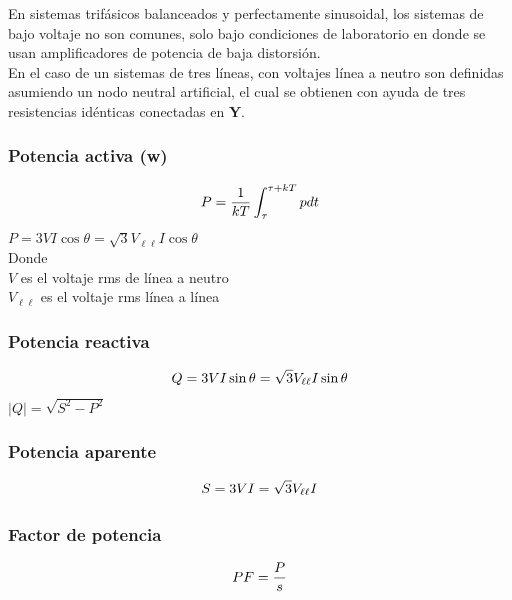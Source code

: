 En sistemas trifásicos balanceados y perfectamente sinusoidal, los sistemas de bajo voltaje no son comunes, solo bajo condiciones de laboratorio en donde se usan amplificadores de potencia de baja distorsión.\cite{A30}\\

En el caso de un sistemas de tres líneas, con voltajes línea a neutro son definidas asumiendo un nodo neutral artificial, el cual se obtienen con ayuda de tres resistencias idénticas conectadas en \textbf{Y}.

\subsubsection{Potencia activa (w)} 
\begin{equation}\label{Eq37}
P=\frac{1}{kT}\int_{\tau}^{\tau +kT}pdt\\
\end{equation}
$P=3VI\cos\theta=\sqrt{3}V_{\ell \ell}I\cos\theta$\\
Donde\\
$V$              es el voltaje rms de línea a neutro\\
$V_{\ell \ell}$  es el voltaje rms línea a línea\\

\subsubsection{Potencia reactiva}


\begin{equation}\label{EQ38}
Q=3VI\sin\theta=\sqrt{3}V_{\ell \ell}I\sin\theta\\
\end{equation}
$|Q|=\sqrt{S^2-P^2}$\\

\subsubsection{Potencia aparente}

\begin{equation}\label{EQ39}
S=3VI=\sqrt{3}V_{\ell \ell}I\\
\end{equation}

\subsubsection{Factor de potencia}

\begin{equation}\label{EQ40}
PF=\frac{P}{s}\\
\end{equation}

